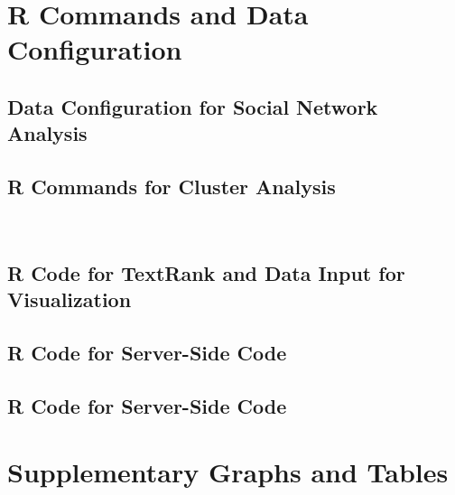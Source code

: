 \documentclass[11pt]{article}
\begin{document}



\section{R Commands and Data Configuration} \label{App:AppendixA}
\subsection{Data Configuration for Social Network Analysis}

\subsection{R Commands for Cluster Analysis}
\
\subsection{R Code for TextRank and Data Input for Visualization}

\subsection{R Code for Server-Side Code}

\subsection{R Code for Server-Side Code}

\clearpage

\section{Supplementary Graphs and Tables} \label{App:AppendixB}

\end{document}
